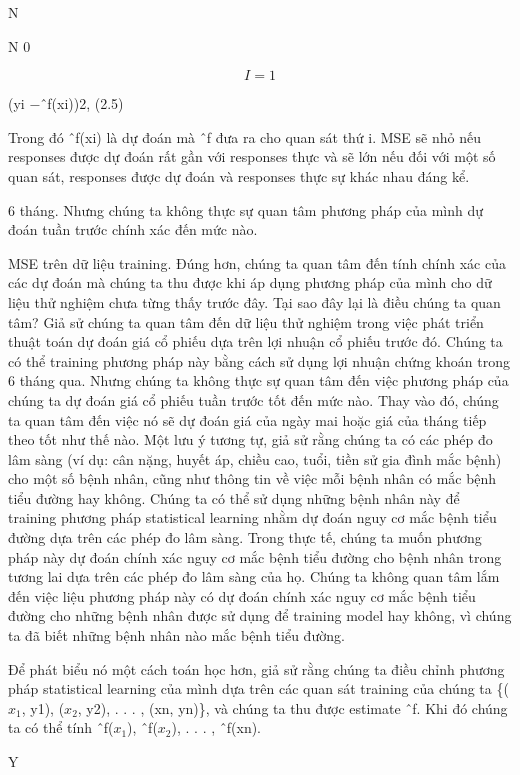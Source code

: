 N

N 0

\[I=1\]

(yi −ˆf(xi))2, (2.5)

Trong đó ˆf(xi) là dự đoán mà ˆf đưa ra cho quan sát thứ i. MSE sẽ nhỏ nếu responses được dự đoán rất gần với responses thực và sẽ lớn nếu đối với một số quan sát, responses được dự đoán và responses thực sự khác nhau đáng kể.

6 tháng. Nhưng chúng ta không thực sự quan tâm phương pháp của mình dự đoán tuần trước chính xác đến mức nào.

MSE trên dữ liệu training. Đúng hơn, chúng ta quan tâm đến tính chính xác của các dự đoán mà chúng ta thu được khi áp dụng phương pháp của mình cho dữ liệu thử nghiệm chưa từng thấy trước đây. Tại sao đây lại là điều chúng ta quan tâm? Giả sử chúng ta quan tâm đến dữ liệu thử nghiệm trong việc phát triển thuật toán dự đoán giá cổ phiếu dựa trên lợi nhuận cổ phiếu trước đó. Chúng ta có thể training phương pháp này bằng cách sử dụng lợi nhuận chứng khoán trong 6 tháng qua. Nhưng chúng ta không thực sự quan tâm đến việc phương pháp của chúng ta dự đoán giá cổ phiếu tuần trước tốt đến mức nào. Thay vào đó, chúng ta quan tâm đến việc nó sẽ dự đoán giá của ngày mai hoặc giá của tháng tiếp theo tốt như thế nào. Một lưu ý tương tự, giả sử rằng chúng ta có các phép đo lâm sàng (ví dụ: cân nặng, huyết áp, chiều cao, tuổi, tiền sử gia đình mắc bệnh) cho một số bệnh nhân, cũng như thông tin về việc mỗi bệnh nhân có mắc bệnh tiểu đường hay không. Chúng ta có thể sử dụng những bệnh nhân này để training phương pháp statistical learning nhằm dự đoán nguy cơ mắc bệnh tiểu đường dựa trên các phép đo lâm sàng. Trong thực tế, chúng ta muốn phương pháp này dự đoán chính xác nguy cơ mắc bệnh tiểu đường cho bệnh nhân trong tương lai dựa trên các phép đo lâm sàng của họ. Chúng ta không quan tâm lắm đến việc liệu phương pháp này có dự đoán chính xác nguy cơ mắc bệnh tiểu đường cho những bệnh nhân được sử dụng để training model hay không, vì chúng ta đã biết những bệnh nhân nào mắc bệnh tiểu đường.

Để phát biểu nó một cách toán học hơn, giả sử rằng chúng ta điều chỉnh phương pháp statistical learning của mình dựa trên các quan sát training của chúng ta \{($x_{1}$, y1), ($x_{2}$, y2), . . . , (xn, yn)\}, và chúng ta thu được estimate ˆf. Khi đó chúng ta có thể tính ˆf($x_{1}$), ˆf($x_{2}$), . . . , ˆf(xn).

Y

